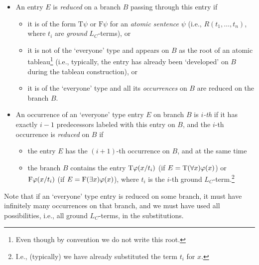 \begin{definition}
\begin{itemize}
        \item An entry $E$ is \emph{reduced} on a branch $B$ passing through this entry if 
        \begin{itemize}
            \item it is of the form $\mathrm{T}\psi$ or $\mathrm{F}\psi$ for an \emph{atomic sentence} $\psi$ (i.e., $R(t_1,\dots,t_n)$, where $t_i$ are \emph{ground} $L_C$-terms), or
            \item it is not of the `everyone' type and appears on $B$ as the root of an atomic tableau\footnote{Even though by convention we do not write this root.} (i.e., typically, the entry has already been `developed' on $B$ during the tableau construction), or
            \item it is of the `everyone' type and all its \emph{occurrences} on $B$ are reduced on the branch $B$.
        \end{itemize}
        \item An occurrence of an `everyone' type entry $E$ on branch $B$ is \emph{$i$-th} if it has exactly $i-1$ predecessors labeled with this entry on $B$, and the $i$-th occurrence is \emph{reduced} on $B$ if
        \begin{itemize}
            \item the entry $E$ has the $(i+1)$-th occurrence on $B$, and at the same time
            \item the branch $B$ contains the entry $\mathrm{T}\varphi(x/t_i)$ (if $E=\mathrm{T}(\forall x)\varphi(x)$) or $\mathrm{F}\varphi(x/t_i)$ (if $E=\mathrm{F}(\exists x)\varphi(x)$), where $t_i$ is the $i$-th ground $L_C$-term.\footnote{I.e., (typically) we have already substituted the term $t_i$ for $x$.}
        \end{itemize} 
    \end{itemize}
\end{definition}
Note that if an `everyone' type entry is reduced on some branch, it must have infinitely many occurrences on that branch, and we must have used all possibilities, i.e., all ground $L_C$-terms, in the substitutions.

